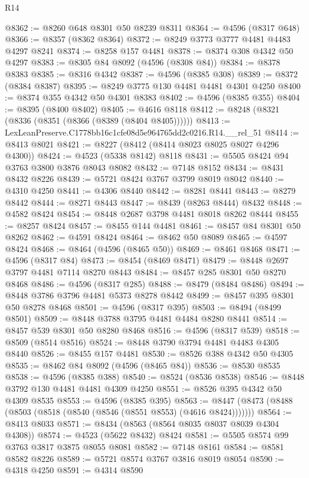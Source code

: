 \begin{lexlean}{R14}
\begin{coremodule}
@8362 := @8260 @648 @8301 @50 @8239 @8311
@8364 := @4596 (@8317 @648)
@8366 := @8357 (@8362 @8364)
@8372 := @8249 @3773 @3777 @4481 @4483 @4297 @8241
@8374 := @8258 @157 @4481
@8378 := @8374 @308 @4342 @50 @4297
@8383 := @8305 @84 @8092 (@4596 (@8308 @84))
@8384 := @8378 @8383
@8385 := @8316 @4342
@8387 := @4596 (@8385 @308)
@8389 := @8372 (@8384 @8387)
@8395 := @8249 @3775 @130 @4481 @4481 @4301 @4250
@8400 := @8374 @355 @4342 @50 @4301 @8383
@8402 := @4596 (@8385 @355)
@8404 := @8395 (@8400 @8402)
@8405 := @4616 @8118
@8412 := @8248 (@8321 (@8336 (@8351 (@8366 (@8389 (@8404 @8405))))))
@8413 := LexLeanPreserve.C1778bb16c1cfe08d5e964765dd2c0216.R14.__rel_51
@8414 := @8413 @8021
@8421 := @8227 (@8412 (@8414 @8023 @8025 @8027 @4296 @4300))
@8424 := @4523 (@5338 @8142) @8118
@8431 := @5505 @8424 @94 @3763 @3800 @3876 @8043 @8082
@8432 := @7148 @8152
@8434 := @8431 @8432 @8226
@8439 := @5721 @8424 @3767 @3799 @8019 @8042
@8440 := @4310 @4250
@8441 := @4306 @8440
@8442 := @8281 @8441
@8443 := @8279 @8442
@8444 := @8271 @8443
@8447 := @8439 (@8263 @8444) @8432
@8448 := @4582 @8424
@8454 := @8448 @2687 @3798 @4481 @8018 @8262 @8444
@8455 := @8257 @8424
@8457 := @8455 @144 @4481
@8461 := @8457 @84 @8301 @50 @8262
@8462 := @4591 @8424
@8464 := @8462 @50 @8089
@8465 := @4597 @8424
@8468 := @8464 (@4596 (@8465 @50))
@8469 := @8461 @8468
@8471 := @4596 (@8317 @84)
@8473 := @8454 (@8469 @8471)
@8479 := @8448 @2697 @3797 @4481 @7114 @8270 @8443
@8484 := @8457 @285 @8301 @50 @8270 @8468
@8486 := @4596 (@8317 @285)
@8488 := @8479 (@8484 @8486)
@8494 := @8448 @3786 @3796 @4481 @5373 @8278 @8442
@8499 := @8457 @395 @8301 @50 @8278 @8468
@8501 := @4596 (@8317 @395)
@8503 := @8494 (@8499 @8501)
@8509 := @8448 @3788 @3795 @4481 @4484 @8280 @8441
@8514 := @8457 @539 @8301 @50 @8280 @8468
@8516 := @4596 (@8317 @539)
@8518 := @8509 (@8514 @8516)
@8524 := @8448 @3790 @3794 @4481 @4483 @4305 @8440
@8526 := @8455 @157 @4481
@8530 := @8526 @388 @4342 @50 @4305
@8535 := @8462 @84 @8092 (@4596 (@8465 @84))
@8536 := @8530 @8535
@8538 := @4596 (@8385 @388)
@8540 := @8524 (@8536 @8538)
@8546 := @8448 @3792 @130 @4481 @4481 @4309 @4250
@8551 := @8526 @395 @4342 @50 @4309 @8535
@8553 := @4596 (@8385 @395)
@8563 := @8447 (@8473 (@8488 (@8503 (@8518 (@8540 (@8546 (@8551 @8553) (@4616 @8424)))))))
@8564 := @8413 @8033
@8571 := @8434 (@8563 (@8564 @8035 @8037 @8039 @4304 @4308))
@8574 := @4523 (@5622 @8432) @8424
@8581 := @5505 @8574 @99 @3763 @3817 @3875 @8055 @8081
@8582 := @7148 @8161
@8584 := @8581 @8582 @8226
@8589 := @5721 @8574 @3767 @3816 @8019 @8054
@8590 := @4318 @4250
@8591 := @4314 @8590

\end{coremodule}
\end{lexlean}
